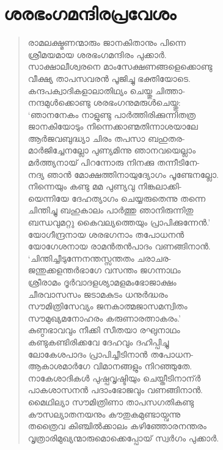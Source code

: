 \section{ശരഭംഗമന്ദിരപ്രവേശം}

\begin{verse}
രാമലക്ഷ്മണന്മാരും ജാനകിതാനും പിന്നെ\\
ശ്രീമയമായ ശരഭംഗമന്ദിരം പുക്കാര്‍.\\
സാക്ഷാലീശ്വരനെ മാംസേക്ഷണങ്ങളെക്കൊണ്ടു\\
വീക്ഷ്യ താപസവരന്‍ പൂജിച്ചു ഭക്തിയോടെ.\\
കന്ദപക്വാദികളാലാതിഥ്യം ചെയ്തു ചിത്താ-\\
നന്ദമുള്‍ക്കൊണ്ടു ശരഭംഗനുമരുള്‍ചെയ്തു:\\
‘ഞാനനേകം നാളുണ്ടു പാര്‍ത്തിരിക്കുന്നിതത്ര\\
ജാനകിയോടും നിന്നെക്കാണ്മതിന്നാശയാലേ\\
ആര്‍ജവബുദ്ധ്യാ ചിരം തപസാ ബഹുതര-\\
മാര്‍ജിച്ചേനല്ലോ പുണ്യമിന്നു ഞാനവയെല്ലാം\\
മര്‍ത്ത്യനായ് പിറന്നോരു നിനക്കു തന്നീടിനേ-\\
നദ്യ ഞാന്‍ മോക്ഷത്തിനായുദ്യോഗം പൂണ്ടേനല്ലോ.\\
നിന്നെയും കണ്ടു മമ പുണ്യവു നിങ്കലാക്കി-\\
യെന്നിയേ ദേഹത്യാഗം ചെയ്യരുതെന്നു തന്നെ\\
ചിന്തിച്ചു ബഹുകാലം പാര്‍ത്തു ഞാനിരുന്നിതു\\
ബന്ധവുമറ്റു കൈവല്യത്തെയും പ്രാപിക്കുന്നേന്‍.’\\
യോഗീന്ദ്രനായ ശരഭഗനാം തപോധനന്‍\\
യോഗേശനായ രാമന്‍തന്‍പാദം വണങ്ങിനാന്‍.\\
‘ചിന്തിച്ചീടുന്നേനന്തസ്സന്തതം ചരാചര-\\
ജന്തുക്കളന്തര്‍ഭാഗേ വസന്തം ജഗന്നാഥം\\
ശ്രീരാമം ദൂര്‍വാദളശ്യാമളമംഭോജാക്ഷം\\
ചീരവാസസം ജടാമകുടം ധനുര്‍ദ്ധരം\\
സൗമിത്രിസേവ്യം ജനകാത്മജാസമന്വിതം\\
സൗമുഖ്യമനോഹരം കരുണാരത്നാകരം.’\\
കുണ്ഠഭാവവും നീക്കി സീതയാ രഘുനാഥം\\
കണ്ടുകണ്ടിരിക്കവേ ദേഹവും ദഹിപ്പിച്ചു\\
ലോകേശപാദം പ്രാപിച്ചീടിനാന്‍ തപോധന-\\
ആകാശമാര്‍ഗേ വിമാനങ്ങളും നിറഞ്ഞുതേ.\\
നാകേശാദികള്‍ പുഷ്പവൃഷ്ടിയും ചെയ്തീടിനാന്ര്‍\\
പാകശാസനന്‍ പദാംഭോജവും വണങ്ങിനാന്‍.\\
മൈഥില്യാ സൗമിത്രിണാ താപസഗതികണ്ടു\\
കൗസല്യാതനയനും കൗതുകമുണ്ടായ്വന്നു\\
തത്രൈവ കിഞ്ചില്‍ക്കാലം കഴിഞ്ഞോരനന്തരം\\
വൃത്രാരിമുഖ്യന്മാരുമൊക്കെപ്പോയ് സ്വര്‍ഗം പുക്കാര്‍.
\end{verse}

